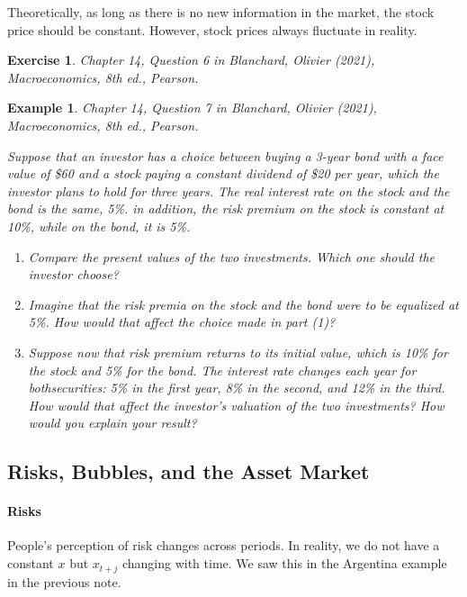 \documentclass[12pt]{article}
\newtheorem{example}{Example}
\newtheorem{exercise}{Exercise}
\begin{document}
Theoretically, as long as there is no new information in the market, the stock price should be constant. However, stock prices always fluctuate in reality. 

\begin{exercise}
    Chapter 14, Question 6 in Blanchard, Olivier (2021), \textit{Macroeconomics}, 8th ed., Pearson.
\end{exercise}

\begin{example}
    Chapter 14, Question 7 in Blanchard, Olivier (2021), \textit{Macroeconomics}, 8th ed., Pearson.

    Suppose that an investor has a choice between buying a 3-year bond with a face value of \$60 and a stock paying a constant dividend of \$20 per year, which the investor plans to hold for three years. The real interest rate on the stock and the bond is the same, 5\%. in addition, the risk premium on the stock is constant at 10\%, while on the bond, it is 5\%.
    \begin{enumerate}[label=(\arabic*)]
        \item Compare the present values of the two investments. Which one should the investor choose?
        \vspace{60pt}
        \item Imagine that the risk premia on the stock and the bond were to be equalized at 5\%. How would that affect the choice made in part (1)?
        \vspace{60pt}
        \item Suppose now that risk premium returns to its initial value, which is 10\% for the stock and 5\% for the bond. The interest rate changes each year for bothsecurities: 5\% in the first year, 8\% in the second, and 12\% in the third. How would that affect the investor's valuation of the two investments? How would you explain your result?
        \vspace{60pt}
    \end{enumerate}
\end{example}

\subsection*{Risks, Bubbles, and the Asset Market}
\paragraph{Risks} People's perception of risk changes across periods. In reality, we do not have a constant $x$ but $x_{t+j}$ changing with time. We saw this in the Argentina example in the previous note.
\end{document}
